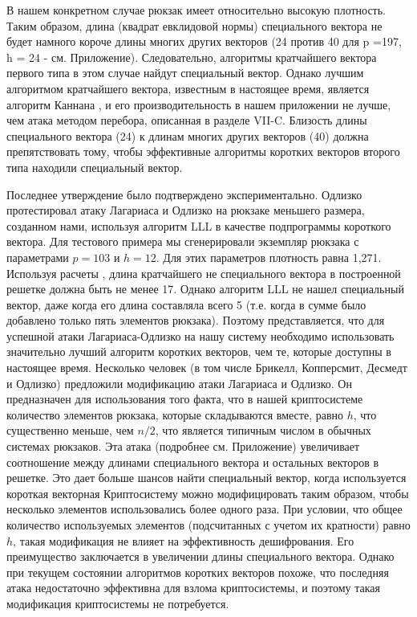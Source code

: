 \documentclass[a4paper,12pt]{article}
\newcommand{\DL}{\newline\newline}
\begin{document}
\indent В нашем конкретном случае рюкзак имеет относительно высокую плотность. Таким образом, длина (квадрат евклидовой нормы) специального вектора не будет намного короче длины многих других векторов (24 против 40 для p =197, h = 24 - см. Приложение). Следовательно, алгоритмы кратчайшего вектора первого типа в этом случае найдут специальный вектор. Однако лучшим алгоритмом кратчайшего вектора, известным в настоящее время, является алгоритм Каннана \cite{15}, и его производительность в нашем приложении не лучше, чем атака методом перебора, описанная в разделе VII-C. Близость длины специального вектора (24) к длинам многих других векторов (40) должна препятствовать тому, чтобы эффективные алгоритмы коротких векторов второго типа находили специальный вектор. \newline

\indent
Последнее утверждение было подтверждено экспериментально. Одлизко протестировал атаку Лагариаса и Одлизко на рюкзаке меньшего размера, созданном нами, используя алгоритм LLL в качестве подпрограммы короткого вектора. Для тестового примера мы сгенерировали экземпляр рюкзака с параметрами $p = 103$ и $h = 12$. Для этих параметров плотность равна 1,271. Используя расчеты \cite{17}, длина кратчайшего не специального вектора в построенной решетке должна быть не менее 17. Однако алгоритм LLL не нашел специальный вектор, даже когда его длина составляла всего 5 (т.е. когда в сумме было добавлено только пять элементов рюкзака). Поэтому представляется, что для успешной атаки Лагариаса-Одлизко на нашу систему необходимо использовать значительно лучший алгоритм коротких векторов, чем те, которые доступны в настоящее время. \newline
\indent 
Несколько человек (в том числе Брикелл, Копперсмит, Десмедт и Одлизко) предложили модификацию атаки Лагариаса и Одлизко. Он предназначен для использования того факта, что в нашей криптосистеме количество элементов рюкзака, которые складываются вместе, равно $h$, что существенно меньше, чем $n /2$, что является типичным числом в обычных системах рюкзаков. Эта атака (подробнее см. Приложение) увеличивает соотношение между длинами специального вектора и остальных векторов в решетке. Это дает больше шансов найти специальный вектор, когда используется короткая векторная  \newline
\indent 
Криптосистему можно модифицировать таким образом, чтобы несколько элементов использовались более одного раза. При условии, что общее количество используемых элементов (подсчитанных с учетом их кратности) равно $h$, такая модификация не влияет на эффективность дешифрования. Его преимущество заключается в увеличении длины специального вектора. Однако при текущем состоянии алгоритмов коротких векторов похоже, что последняя атака недостаточно эффективна для взлома криптосистемы, и поэтому такая модификация криптосистемы не потребуется. \DL \newline
\end{document}
